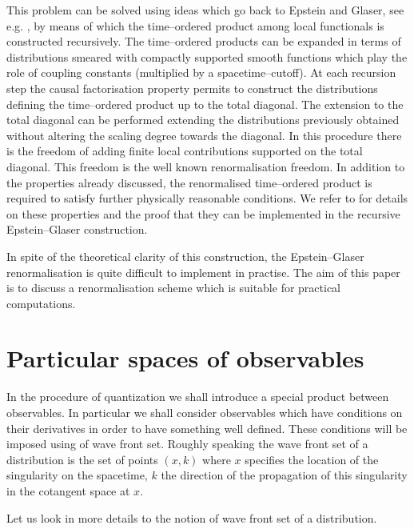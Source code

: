 \documentclass[10pt]{book}
\theoremstyle{break}
\begin{document}
This problem can be solved using ideas which go back to Epstein and Glaser, see e.g. %
, by means of which the time--ordered product among local functionals is constructed recursively.
The time--ordered products can be expanded in terms of distributions smeared with compactly supported smooth functions which play the role of coupling constants (multiplied by a spacetime--cutoff). At each recursion step the causal factorisation property %
permits to construct the distributions defining the time--ordered product up to the total diagonal. 
The extension to the total diagonal can be performed extending the distributions previously obtained without altering the scaling degree towards the diagonal. In this procedure there is the freedom of adding finite local contributions supported on the total diagonal. This freedom is the well known renormalisation freedom. In addition to the properties already discussed, the renormalised time--ordered product is required to satisfy further physically reasonable conditions. We refer to %
for details on these properties and the proof that they can be implemented in the recursive Epstein--Glaser construction.

In spite of the theoretical clarity of this construction, the Epstein--Glaser renormalisation is quite difficult to implement in practise. The aim of this paper is to discuss a renormalisation scheme which is suitable for practical computations.


\section{Particular spaces of observables}


In the procedure of quantization we shall introduce a special product between observables. In particular we shall consider observables which have conditions on their derivatives in order to have something well defined. These conditions will be imposed using of wave front set. Roughly speaking the wave front set of a distribution is the set of points $(x,k)$ where $x$ specifies the location of the singularity on the spacetime, $k$ the direction of the propagation of this singularity in the cotangent space at $x$.

\bigskip

Let us look in more details to the notion of wave front set of a distribution.
\end{document}
